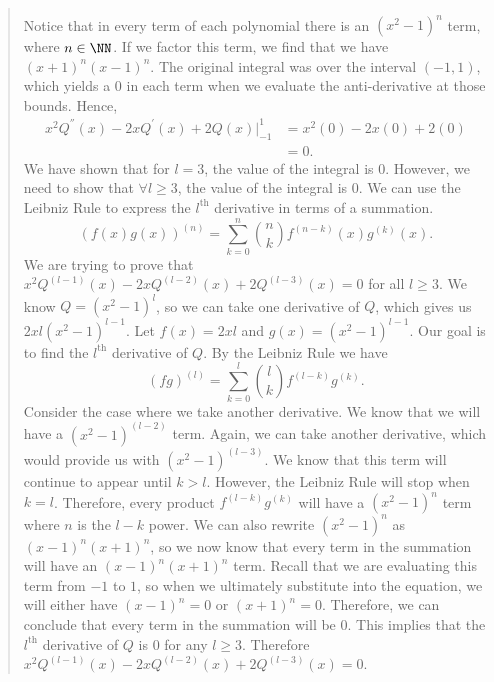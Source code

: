 \documentclass{hw}
\begin{document}
\begin{enumerate}
\begin{quote}
\begin{align*}
\end{align*}
Notice that in every term of each polynomial there is an $(x^2-1)^n$ term, where $n\in\NN$. If we factor
this term, we find that we have $(x+1)^n(x-1)^n$. The original integral was over the interval $(-1,1)$,
which yields a 0 in each term when we evaluate the anti-derivative at those bounds. Hence,
\begin{align*}
x^2Q^{''}(x) - 2xQ^{'}(x) + 2Q(x)\Big|_{-1}^{1} &= x^2(0)-2x(0)+2(0)\\
&= 0.
\end{align*}
We have shown that for $l=3$, the value of the integral is 0. However, we need to show that
$\forall l\geq3$, the value of the integral is 0. We can use the Leibniz Rule to express the
$l^{\text{th}}$ derivative in terms of a summation.
\[
(f(x)g(x))^{(n)} = \sum_{k=0}^{n}{n\choose k}f^{(n-k)}(x)g^{(k)}(x).
\]
We are trying to prove that $x^2Q^{(l-1)}(x) - 2xQ^{(l-2)}(x) + 2Q^{(l-3)}(x) = 0$ for all $l\geq3$.
We know $Q=(x^2-1)^l$, so we can take one derivative of $Q$, which gives us $2xl(x^2-1)^{l-1}$. Let
$f(x)=2xl$ and $g(x)=(x^2-1)^{l-1}$. Our goal is to find the $l^{\text{th}}$ derivative of $Q$.
By the Leibniz Rule we have
\[
(fg)^{(l)} = \sum_{k=0}^{l}{l\choose k}f^{(l-k)}g^{(k)}.
\]
Consider the case where we take another derivative. We know that we will have a $(x^2-1)^{(l-2)}$ term.
Again, we can take another derivative, which would provide us with $(x^2-1)^{(l-3)}$. We know that this
term will continue to appear until $k>l$. However, the Leibniz Rule will stop when $k=l$. Therefore,
every product $f^{(l-k)}g^{(k)}$ will have a $(x^2-1)^{n}$ term where $n$ is the $l-k$ power.
We can also rewrite $(x^2-1)^{n}$ as $(x-1)^n(x+1)^n$, so we now know that every term in the summation
will have an $(x-1)^n(x+1)^n$ term. Recall that we are evaluating this term from $-1$ to $1$, so
when we ultimately substitute into the equation, we will either have $(x-1)^n = 0$ or $(x+1)^n = 0$.
Therefore, we can conclude that every term in the summation will be 0. This implies that the
$l^{\text{th}}$ derivative of $Q$ is 0 for any $l \geq 3$. Therefore
$x^2Q^{(l-1)}(x) - 2xQ^{(l-2)}(x) + 2Q^{(l-3)}(x) = 0$.
\end{quote}




\end{enumerate}
\end{document}
